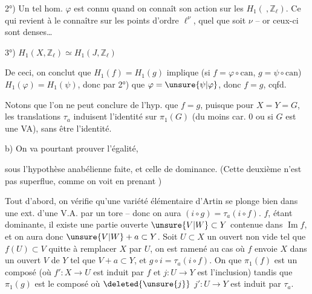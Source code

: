 2°)  Un tel hom. $\varphi$ est connu quand on connaît son action sur les $H_1(\ ,\mathbb Z_\ell)$. Ce qui revient à le connaître sur les points d'ordre $\ell^\nu$, quel que soit $\nu$ -- or ceux-ci sont denses\ldots

3°) $H_1(X,\mathbb Z_\ell)\simeq H_1(J,\mathbb Z_\ell)$

De ceci,  on conclut  que $H_1(f)=H_1(g)$ implique (si $f=\varphi\circ\mathrm{can}$, $g=\psi\circ\mathrm{can}$) $H_1(\varphi)=H_1(\psi)$, donc par 2°) que $\varphi=\unsure{\psi|\varphi}$, donc $f=g$, cqfd.

 Notons que l'on ne peut conclure de l'hyp.  que $f=g$, puisque pour $X=Y=G$, les translations $\tau_a$ induisent l'identité sur $\pi_1(G)$ (du moins  car. $0$ ou si $G$ est une VA), sans être l'identité.

b) On va pourtant prouver l'égalité,

sous l'hypothèse anabélienne faite, et celle de dominance. (Cette deuxième n'est pas superflue, comme on voit en prenant  )

Tout d'abord, on vérifie qu'une variété élémentaire d'Artin se plonge  bien dans une ext. d'une V.A. par un tore -- donc on aura $(i\circ g)=\tau_a(i\circ f)$.    $f$, étant dominante, il existe une partie ouverte  $\unsure{V|W}\subset Y$ contenue dans $\operatorname{Im}f$, et on aura donc $\unsure{V|W}+a\subset Y$. Soit $U\subset X$ un ouvert non vide tel que $f(U)\subset V$   quitte à remplacer $X$ par $U$, on est ramené au cas où $f$ envoie $X$ dans un ouvert $V$ de $Y$ tel que $V+a\subset Y$, et $g\circ i=\tau_a(i\circ f)$. On   que $\pi_1(f)$ est un composé (où $f':X\longrightarrow U$ est  induit par $f$ et $j:U\longrightarrow Y$ est l'inclusion)
tandis que $\pi_1(g)$ est le composé
où $\deleted{\unsure{j}}$ $j':U\longrightarrow Y$ est induit par $\tau_a$.

